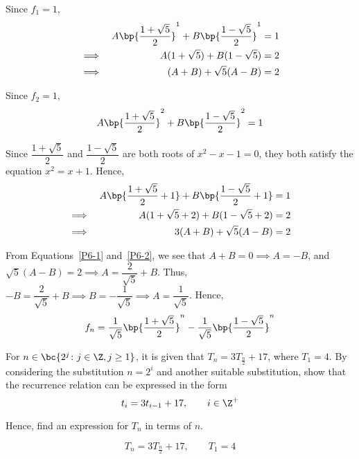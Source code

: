 \documentclass{echw}
\begin{document}
            Since $f_1 = 1$,
            \begin{alignat}{2}
                &&A \bp{\dfrac{1 + \sqrt5}{2}}^1 + B  \bp{\dfrac{1 - \sqrt5}{2}}^1 &= 1\nonumber\\
                \implies&&A (1 + \sqrt5) + B (1 - \sqrt5) &= 2\nonumber\\
                \implies&&(A + B) + \sqrt5(A - B) &= 2\label{P6-1}
            \end{alignat}

            Since $f_2 = 1$,
            \[
                A \bp{\dfrac{1 + \sqrt5}{2}}^2 + B \bp{\dfrac{1 - \sqrt5}{2}}^2 = 1
            \]

            Since $\dfrac{1 + \sqrt5}{2}$ and $\dfrac{1 - \sqrt5}{2}$ are both roots of $x^2 - x - 1 = 0$, they both satisfy the equation $x^2 = x + 1$. Hence,
            \begin{alignat}{2}
                && A \bp{\dfrac{1 + \sqrt5}{2} + 1} + B \bp{\dfrac{1 - \sqrt5}{2} + 1} &= 1\nonumber\\
                \implies&& A (1 + \sqrt5 + 2) + B (1 - \sqrt5 + 2) &= 2\nonumber\\
                \implies&&3(A + B) + \sqrt5 (A - B) &= 2\label{P6-2}
            \end{alignat}

            From Equations~\ref{P6-1} and~\ref{P6-2}, we see that $A + B = 0 \implies A = -B$, and $\sqrt5 (A - B) = 2 \implies A = \dfrac2{\sqrt5} + B$. Thus, $-B = \dfrac2{\sqrt5} + B \implies B = -\dfrac1{\sqrt5} \implies A = \dfrac1{\sqrt5}$. Hence,
            \[
                f_n = \dfrac1{\sqrt5} \bp{\dfrac{1 + \sqrt5}{2}}^n - \dfrac1{\sqrt5} \bp{\dfrac{1 - \sqrt5}{2}}^n
            \]


    \problem{}
        For $n \in \bc{2^j \colon j \in \Z, j \geq 1}$, it is given that $T_n = 3T_{\tfrac{n}2} + 17$, where $T_1 = 4$. By considering the substitution $n = 2^i$ and another suitable substitution, show that the recurrence relation can be expressed in the form
        \[
            t_i = 3t_{i-1} + 17, \qquad i \in \Z^+
        \]
        
        Hence, find an expression for $T_n$ in terms of $n$.

    \solution
        \[
            T_n = 3T_{\tfrac{n}2} + 17, \qquad T_1 = 4
        \]
\end{document}
